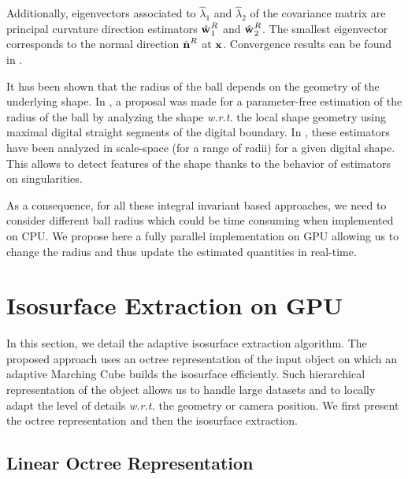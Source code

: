 \documentclass{llncs}
\newcommand{\wrt}{\emph{w.r.t.} }
\begin{document}
Additionally, eigenvectors associated to $\hat{\lambda}_1$ and
$\hat{\lambda}_2$ of the covariance matrix are principal
curvature direction estimators $\hat{\mathbf{w}_{}}_{1}^{R}$ and
$\hat{\mathbf{w}_{}}_{2}^{R}$. The smallest eigenvector corresponds to the normal
direction $\hat{\mathbf{n}{}}^{R}$ at $\mathbf{x}$. Convergence results can be found
in \cite{ChapterIICurvature}.

It has been shown that the radius of the ball depends on the geometry of the
underlying shape. In \cite{DGCI2014}, a proposal was made for a parameter-free
estimation of the radius of the ball by analyzing the shape \wrt the local shape
geometry using maximal digital straight segments of the digital boundary. In
\cite{SMI2015}, these estimators have been analyzed in scale-space (for a range of radii)  for a given digital shape. This allows to detect features of the
shape thanks to the behavior of estimators on singularities.

As a consequence, for all these integral invariant based approaches, we need to
consider different ball radius which could be time consuming when implemented on
CPU. We propose here a fully parallel implementation on GPU allowing us to
change the radius and thus update the estimated quantities in real-time.

\section{Isosurface Extraction on GPU}
\label{sec:isos-extr-gpu}

In this section, we detail the adaptive isosurface extraction
algorithm.
The proposed approach uses an octree representation of the input object
on which an adaptive Marching Cube builds the isosurface efficiently.
Such
hierarchical representation of the object allows us
to handle large datasets and to locally adapt the level of details
\wrt the geometry or camera position. We first present the
octree representation and then the isosurface extraction.

\subsection{Linear Octree Representation}
\end{document}
